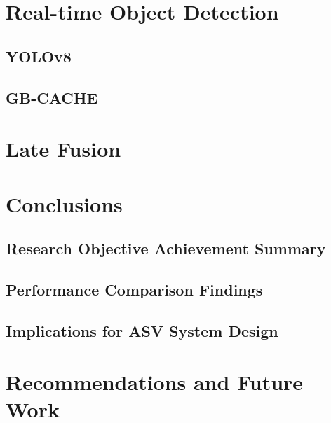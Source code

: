\documentclass{erauthesis}
\begin{document}
\chapter{Real-time Object Detection} \label{realtime_object_detection}

    \section{YOLOv8} \label{yolo}

    \section{GB-CACHE} \label{gbcache}

\chapter{Late Fusion} \label{late_fusion}

\chapter{Conclusions} 


\section{Research Objective Achievement Summary}

\section{Performance Comparison Findings}

\section{Implications for ASV System Design}

\chapter{Recommendations and Future Work} 
\end{document}
